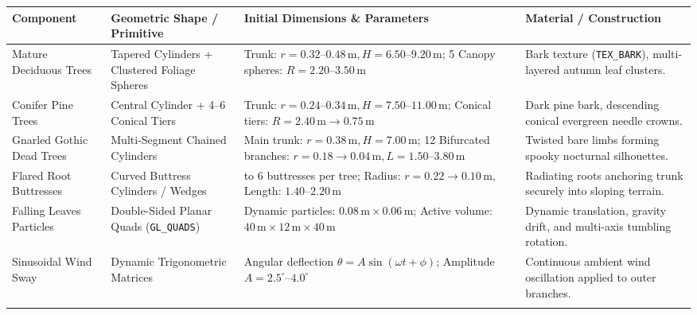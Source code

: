 \documentclass[10pt,a4paper,oneside]{article}
\begin{document}
\begin{longtable}{>{\raggedright\arraybackslash}p{}>{\raggedright\arraybackslash}p{}>{\raggedright\arraybackslash}p{}>{\raggedright\arraybackslash}p{}}
\toprule
\textbf{Component} & \textbf{Geometric Shape / Primitive} & \textbf{Initial Dimensions \& Parameters} & \textbf{Material / Construction} \\
\midrule
\endhead

Mature Deciduous Trees & Tapered Cylinders + Clustered Foliage Spheres & Trunk: $r=0.32\text{--}0.48\,\mathrm{m}, H=6.50\text{--}9.20\,\mathrm{m}$; 5 Canopy spheres: $R=2.20\text{--}3.50\,\mathrm{m}$ & Bark texture (\texttt{TEX\_BARK}), multi-layered autumn leaf clusters.\\\addlinespace[3pt]

Conifer Pine Trees & Central Cylinder + 4--6 Conical Tiers & Trunk: $r=0.24\text{--}0.34\,\mathrm{m}, H=7.50\text{--}11.00\,\mathrm{m}$; Conical tiers: $R=2.40\,\mathrm{m}\to 0.75\,\mathrm{m}$ & Dark pine bark, descending conical evergreen needle crowns.\\\addlinespace[3pt]

Gnarled Gothic Dead Trees & Multi-Segment Chained Cylinders & Main trunk: $r=0.38\,\mathrm{m}, H=7.00\,\mathrm{m}$; 12 Bifurcated branches: $r=0.18\to 0.04\,\mathrm{m}, L=1.50\text{--}3.80\,\mathrm{m}$ & Twisted bare limbs forming spooky nocturnal silhouettes.\\\addlinespace[3pt]

Flared Root Buttresses & Curved Buttress Cylinders / Wedges & 4 to 6 buttresses per tree; Radius: $r=0.22\to 0.10\,\mathrm{m}$, Length: $1.40\text{--}2.20\,\mathrm{m}$ & Radiating roots anchoring trunk securely into sloping terrain.\\\addlinespace[3pt]

Falling Leaves Particles & Double-Sided Planar Quads (\texttt{GL\_QUADS}) & 120 Dynamic particles: $0.08\,\mathrm{m} \times 0.06\,\mathrm{m}$; Active volume: $40\,\mathrm{m}\times 12\,\mathrm{m}\times 40\,\mathrm{m}$ & Dynamic translation, gravity drift, and multi-axis tumbling rotation.\\\addlinespace[3pt]

Sinusoidal Wind Sway & Dynamic Trigonometric Matrices & Angular deflection $\theta = A\sin(\omega t + \phi)$; Amplitude $A=2.5^\circ\text{--}4.0^\circ$ & Continuous ambient wind oscillation applied to outer branches.\\\addlinespace[3pt]

\bottomrule\end{longtable}
\end{document}
